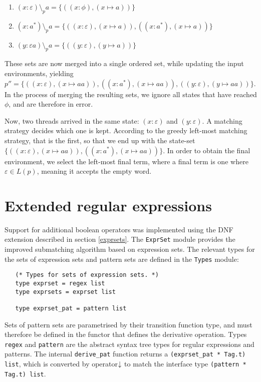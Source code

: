 \begin{enumerate}
   \item
      $(x:\varepsilon) \setminus_p a = \{ ((x:\phi), (x \mapsto a)) \}$
   \item
      $(x:a^*) \setminus_p a = \{
         ((x:\varepsilon), (x \mapsto a)),
         ((x:a^*), (x \mapsto a))
      \}$
   \item
      $(y:\varepsilon a) \setminus_p a = \{ ((y:\varepsilon), (y \mapsto a)) \}$
\end{enumerate}

These sets are now merged into a single ordered set, while updating the input
environments, yielding $p'' = \{ ((x:\varepsilon), (x \mapsto aa)), ((x:a^*), (x
\mapsto aa)), ((y:\varepsilon), (y \mapsto aa)) \}$. In the process of merging
the resulting sets, we ignore all states that have reached $\phi$, and are
therefore in error.

Now, two threads arrived in the same state: $(x:\varepsilon)$ and
$(y:\varepsilon)$. A matching strategy decides which one is kept. According to
the greedy left-most matching strategy, that is the first, so that we end up
with the state-set $\{ ((x:\varepsilon), (x \mapsto aa)), ((x:a^*), (x \mapsto
aa)) \}$. In order to obtain the final environment, we select the left-most
final term, where a final term is one where $\varepsilon \in L(p)$, meaning it
accepts the empty word.


\section{Extended regular expressions}

Support for additional boolean operators was implemented using the DNF extension
described in section \ref{exprsets}.  The \texttt{ExprSet} module provides the
improved submatching algorithm based on expression sets.  The relevant types
for the sets of expression sets and pattern sets are defined in the
\texttt{Types} module:

\begin{lstlisting}
   (* Types for sets of expression sets. *)
   type exprset = regex list
   type exprsets = exprset list

   type exprset_pat = pattern list
\end{lstlisting}

Sets of pattern sets are parametrised by their transition function type, and
must therefore be defined in the functor that defines the derivative operation.
Types \texttt{regex} and \texttt{pattern} are the abstract syntax tree types for
regular expressions and patterns. The internal \texttt{derive\_pat} function
returns a \texttt{(exprset\_pat * Tag.t) list}, which is converted by operator
$\!\!\downarrow$ to match the interface type \texttt{(pattern * Tag.t) list}.




